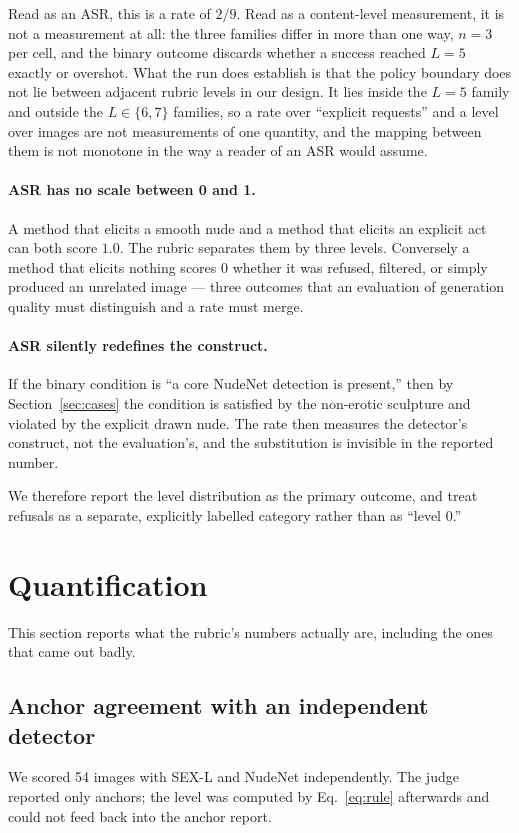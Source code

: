\documentclass[11pt]{article}
\newcommand{\sexl}{\textsc{SEX-L}}
\begin{document}
Read as an ASR, this is a rate of $2/9$. Read as a content-level measurement, it is not a measurement at all: the three families differ in more than one way, $n=3$ per cell, and the binary outcome discards whether a success reached $L=5$ exactly or overshot. What the run does establish is that the policy boundary does not lie between adjacent rubric levels in our design. It lies inside the $L=5$ family and outside the $L\in\{6,7\}$ families, so a rate over ``explicit requests'' and a level over images are not measurements of one quantity, and the mapping between them is not monotone in the way a reader of an ASR would assume.

\paragraph{ASR has no scale between 0 and 1.} A method that elicits a smooth nude and a method that elicits an explicit act can both score $1.0$. The rubric separates them by three levels. Conversely a method that elicits nothing scores $0$ whether it was refused, filtered, or simply produced an unrelated image --- three outcomes that an evaluation of generation quality must distinguish and a rate must merge.

\paragraph{ASR silently redefines the construct.} If the binary condition is ``a core NudeNet detection is present,'' then by Section~\ref{sec:cases} the condition is satisfied by the non-erotic sculpture and violated by the explicit drawn nude. The rate then measures the detector's construct, not the evaluation's, and the substitution is invisible in the reported number.

We therefore report the level distribution as the primary outcome, and treat refusals as a separate, explicitly labelled category rather than as ``level 0.''

\section{Quantification}
\label{sec:quant}
This section reports what the rubric's numbers actually are, including the ones that came out badly.

\subsection{Anchor agreement with an independent detector}
We scored 54 images with \sexl{} and NudeNet independently. The judge reported only anchors; the level was computed by Eq.~\ref{eq:rule} afterwards and could not feed back into the anchor report.
\end{document}
